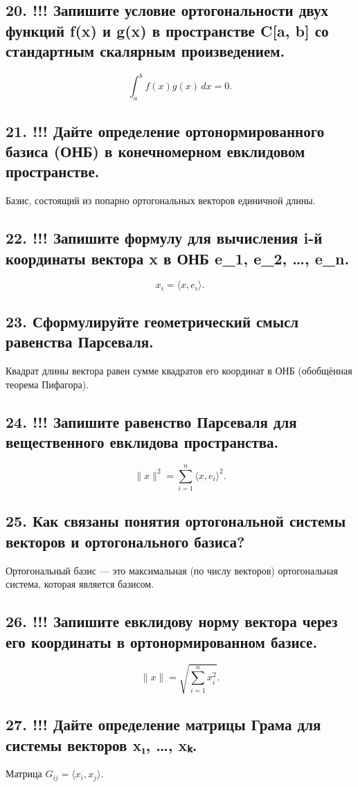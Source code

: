\documentclass[a4paper,12pt]{article}
\begin{document}
\subsection*{20. !!! Запишите условие ортогональности двух функций f(x) и g(x) в пространстве C[a, b] со стандартным скалярным произведением.}
\[ \int_a^b f(x) g(x) \, dx = 0. \]

\subsection*{21. !!! Дайте определение ортонормированного базиса (ОНБ) в конечномерном евклидовом пространстве.}
Базис, состоящий из попарно ортогональных векторов единичной длины.

\subsection*{22. !!! Запишите формулу для вычисления i-й координаты вектора x в ОНБ {e_1, e_2, …, e_n}.}
\[ x_i = \langle x, e_i \rangle. \]

\subsection*{23. Сформулируйте геометрический смысл равенства Парсеваля.}
Квадрат длины вектора равен сумме квадратов его координат в ОНБ (обобщённая теорема Пифагора).

\subsection*{24. !!! Запишите равенство Парсеваля для вещественного евклидова пространства.}
\[ \|x\|^2 = \sum_{i=1}^n \langle x, e_i \rangle^2. \]

\subsection*{25. Как связаны понятия ортогональной системы векторов и ортогонального базиса?}
Ортогональный базис — это максимальная (по числу векторов) ортогональная система, которая является базисом.

\subsection*{26. !!! Запишите евклидову норму вектора через его координаты в ортонормированном базисе.}
\[ \|x\| = \sqrt{\sum_{i=1}^n x_i^2}. \]

\subsection*{27. !!! Дайте определение матрицы Грама для системы векторов {x₁, …, xₖ}.}
Матрица \(G_{ij} = \langle x_i, x_j \rangle\).
\end{document}

